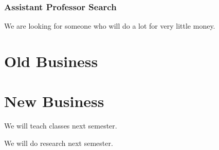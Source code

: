 \documentclass[11pt]{meetingmins}
\begin{document}
\subsubsection{Assistant Professor Search}
We are looking for someone who will do a lot for very little money.

\section{Old Business}
\begin{items}
\item
\priormins
\end{items}

\section{New Business}
\begin{items}
\item
We will teach classes next semester.

\item
We will do research next semester.
\end{items}

\vspace{1em}
\end{document}
